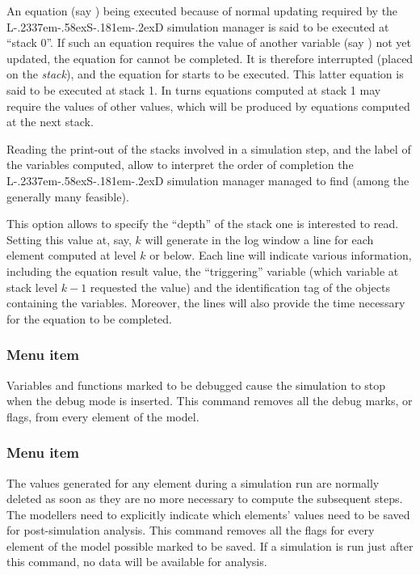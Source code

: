 \documentclass [11pt,a4paper] {book}
\def\LsD{{L\kern-.2337em\lower-.58ex\hbox{S}\kern-.181em\lower-.2ex\hbox{D}}\xspace}
\begin{document}
An equation (say ) being executed because of normal updating required by the \LsD simulation manager is said to be executed at ``stack 0''. If such an equation requires the value of another variable (say ) not yet updated, the equation for  cannot be completed. It is therefore interrupted (placed on the \textit{stack}), and the equation for  starts to be executed. This latter equation is said to be executed at stack 1. In turns equations computed at stack 1 may require the values of other values, which will be produced by equations computed at the next stack.

Reading the print-out of the stacks involved in a simulation step, and the label of the variables computed, allow to interpret the order of completion the \LsD simulation manager managed to find (among the generally many feasible). 

This option allows to specify the ``depth'' of the stack one is interested to read. Setting this value at, say, $k$ will generate in the log window a line for each element computed at level $k$ or below. Each line will indicate various information, including the equation result value, the ``triggering'' variable (which variable at stack level $k-1$ requested the value) and the identification tag of the objects containing the variables. Moreover, the lines will also provide the time necessary for the equation to be completed.


\subsubsection{Menu item  }
Variables and functions marked to be debugged cause the simulation to stop when the debug mode is inserted. This command removes all the debug marks, or flags, from every element of the model.

\subsubsection{Menu item  }

The values generated for any element during a simulation run are normally deleted as soon as they are no more necessary to compute the subsequent steps. The modellers need to explicitly indicate which elements' values need to be saved for post-simulation analysis. This command removes all the flags for every element of the model possible marked to be saved. If a simulation is run just after this command, no data will be available for analysis.
\end{document}
